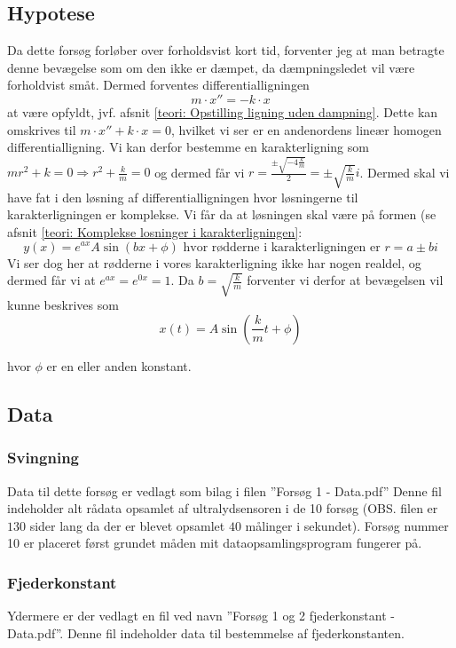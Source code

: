 \subsection{Hypotese}\label{exp1: Hypotese}
Da dette forsøg forløber over forholdsvist kort tid, forventer jeg at man betragte denne bevægelse som om den ikke er dæmpet, da dæmpningsledet vil være forholdvist småt. 
Dermed forventes differentialligningen 
$$m\cdot x'' = -k \cdot x$$
at være opfyldt, jvf. afsnit \ref{teori: Opstilling ligning uden dampning}.
Dette kan omskrives til $m\cdot x'' + k\cdot x=0$, hvilket vi ser er en andenordens lineær homogen differentialligning. 
Vi kan derfor bestemme en karakterligning som $mr^2 + k = 0 \Rightarrow r^2 + \frac{k}{m} = 0$ og dermed får vi $r = \frac{\pm \sqrt{-4\frac{k}{m}}}{2}=\pm\sqrt{\frac{k}{m}}i$.
Dermed skal vi have fat i den løsning af differentialligningen hvor løsningerne til karakterligningen er komplekse. 
Vi får da at løsningen skal være på formen (se afsnit \ref{teori: Komplekse losninger i karakterligningen}:
$$y(x) = e^{ax}A\sin(bx+\phi) \text{ hvor rødderne i karakterligningen er } r = a \pm bi$$
Vi ser dog her at rødderne i vores karakterligning ikke har nogen realdel, og dermed får vi at $e^{ax}=e^{0x}=1$.
Da $b=\sqrt{\frac{k}{m}}$ forventer vi derfor at bevægelsen vil kunne beskrives som 
\begin{equation}
x(t)=A\sin (\frac{k}{m}t+\phi)
\label{eq: exp1 hypotese}
\end{equation}

hvor $\phi$ er en eller anden konstant. 


\subsection{Data}\label{exp1: Data}
\subsubsection{Svingning}
Data til dette forsøg er vedlagt som bilag i filen ''Forsøg 1 - Data.pdf''
Denne fil indeholder alt rådata opsamlet af ultralydsensoren i de 10 forsøg (OBS. filen er $130$ sider lang da der er blevet opsamlet $40$ målinger i sekundet). 
Forsøg nummer 10 er placeret først grundet måden mit dataopsamlingsprogram fungerer på.

\subsubsection{Fjederkonstant}\label{exp1: Fjederkonstant}
Ydermere er der vedlagt en fil ved navn ''Forsøg 1 og 2 fjederkonstant - Data.pdf''.
Denne fil indeholder data til bestemmelse af fjederkonstanten. 

